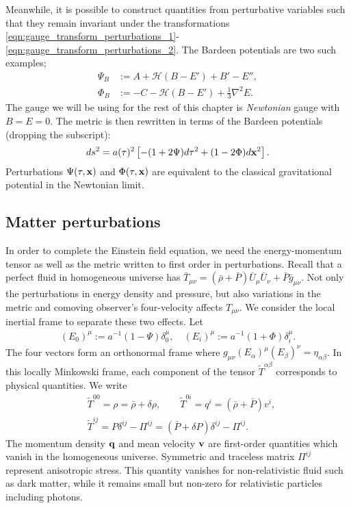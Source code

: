 Meanwhile, it is possible to construct quantities from perturbative variables such that they remain invariant under the transformations \eqref{eqn:gauge_transform_perturbations_1}-\eqref{eqn:gauge_transform_perturbations_2}. The Bardeen potentials are two such examples;
\begin{align}
	\Psi_B &:= A + \mathcal{H}(B-E') + B' - E'', \\
	\Phi_B &:= -C - \mathcal{H}(B-E') + \frac{1}{3}\nabla^2 E.
\end{align}
The gauge we will be using for the rest of this chapter is \textit{Newtonian} gauge with $B=E=0$. The metric is then rewritten in terms of the Bardeen potentials (dropping the subscript):
\begin{align}
	ds^2 = a(\tau)^2 \left[ -(1 + 2\Psi) d\tau^2 + (1-2\Phi) d\mathbf{x}^2  \right]. \label{eqn:perturbed_metric_newtonian_gauge}
\end{align}
Perturbations $\Psi(\tau,\mathbf{x})$ and $\Phi(\tau,\mathbf{x})$ are equivalent to the classical gravitational potential in the Newtonian limit.


\subsection{Matter perturbations}

In order to complete the Einstein field equation, we need the energy-momentum tensor as well as the metric written to first order in perturbations. Recall that a perfect fluid in homogeneous universe has $\bar{T}_{\mu\nu} = (\bar{\rho} + \bar{P}) \bar{U}_\mu \bar{U}_\nu + \bar{P} \bar{g}_{\mu\nu}$. Not only the perturbations in energy density and pressure, but also variations in the metric and comoving observer's four-velocity affects $T_{\mu\nu}$. We consider the local inertial frame to separate these two effects. Let
\begin{align}
	(E_0)^\mu := a^{-1} (1 - \Psi) \delta^\mu_0, \quad (E_i)^\mu := a^{-1} (1 + \Phi) \delta^\mu_i.
\end{align}
The four vectors form an orthonormal frame where $g_{\mu\nu}(E_\alpha)^\mu (E_\beta)^\nu = \eta_{\alpha\beta}$. In this locally Minkowski frame, each component of the tensor $\tilde{T}^{\alpha\beta}$ corresponds to physical quantities. We write
\begin{align}
	&\tilde{T}^{00} = \rho = \bar{\rho} + \delta\rho, \qquad \tilde{T}^{0i} = q^i = (\bar{\rho}+\bar{P})v^i, \\
	&\tilde{T}^{ij} = P \delta^{ij} - \Pi^{ij} = (\bar{P} + \delta P) \delta^{ij} - \Pi^{ij}.
\end{align}
The momentum density $\mathbf{q}$ and mean velocity $\mathbf{v}$ are first-order quantities which vanish in the homogeneous universe. Symmetric and traceless matrix $\Pi^{ij}$ represent anisotropic stress. This quantity vanishes for non-relativistic fluid such as dark matter, while it remains small but non-zero for relativistic particles including photons.


